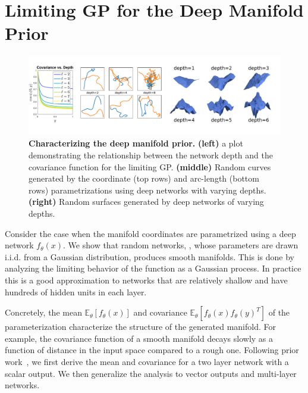 \section{Limiting GP for the Deep Manifold Prior}\label{sec:gp}
\begin{figure}[t]
\centering
\includegraphics[width=\linewidth]{dmp/imgs/priorsamples.pdf}
\vspace{-30pt}
\caption{\label{fig:priorsamples} \small
  \textbf{Characterizing the deep manifold prior.}
  \textbf{(left)} a plot demonstrating the relationship between the network
  depth and the covariance function for the limiting GP. \textbf{(middle)}
  Random curves generated by the coordinate (top rows) and arc-length (bottom rows) parametrizations using deep networks with varying depths. \textbf{(right)} Random surfaces generated by deep networks of varying depths.} 
\end{figure}

Consider the case when the manifold coordinates are parametrized using a deep network 
$f_\theta(x)$.
We show that random networks, \eg, whose 
parameters are drawn i.i.d. from a Gaussian distribution, produces smooth manifolds.
This is done by analyzing the limiting behavior of the function as a Gaussian
process.
In practice this is a good approximation to networks that are
relatively shallow and have hundreds of hidden units in each layer.

Concretely, the mean $\mathbb{E}_\theta[f_\theta(x)]$ and covariance
$\mathbb{E}_\theta[f_\theta(x) f_\theta(y)^T]$ of the parameterization 
characterize the structure of the generated manifold. 
For example, the covariance function of a smooth manifold decays
slowly as a function of distance in the input space compared to
a rough one.
Following prior work~\cite{Neal,williams1997computing,cho2009kernel},
we first derive the mean and covariance for a two layer network with a 
scalar output. We then generalize the analysis to vector outputs and multi-layer
networks.

